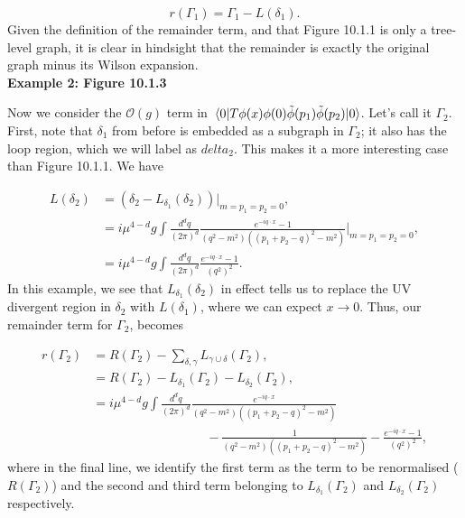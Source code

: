 \documentclass{article}
\begin{document}
\begin{equation}
    r(\Gamma_1) = \Gamma_1 - L(\delta_1).
\end{equation}
Given the definition of the remainder term, and that Figure 10.1.1 is only a tree-level graph, it is clear in hindsight that the remainder is exactly the original graph minus its Wilson expansion.\\

\noindent\textbf{Example 2: Figure 10.1.3}

Now we consider the $\mathcal{O}(g)$ term in $\mel{0}{T\phi(x)\phi(0)\Tilde{\phi}(p_1)\Tilde{\phi}(p_2)}{0}$. Let's call it $\Gamma_2$. First, note that $\delta_1$ from before is embedded as a subgraph in $\Gamma_2$; it also has the loop region, which we will label as $delta_2$. This makes it a more interesting case than Figure 10.1.1. We have

\begin{equation}
    \begin{split}
        L(\delta_2) &= (\delta_2 - L_{\delta_1}(\delta_2))\vert_{m=p_1=p_2=0},\\
        &=i\mu^{4-d}g \int \frac{d^dq}{(2\pi)^d} \frac{e^{-iq\cdot x}-1}{(q^2-m^2)((p_1+p_2-q)^2-m^2)}\bigg\vert_{m=p_1=p_2=0},\\
        &=i\mu^{4-d}g \int \frac{d^dq}{(2\pi)^d} \frac{e^{-iq\cdot x}-1}{(q^2)^2}.
    \end{split}
\end{equation}
In this example, we see that $L_{\delta_1}(\delta_2)$ in effect tells us to replace the UV divergent region in $\delta_2$ with $L(\delta_1)$, where we can expect $x\rightarrow 0$. Thus, our remainder term for $\Gamma_2$, becomes

\begin{equation}
    \begin{split}
        r(\Gamma_2) &= R(\Gamma_2) - \sum_{\delta,\gamma} L_{\gamma \cup \delta}(\Gamma_2),\\
        &= R(\Gamma_2) - L_{\delta_1}(\Gamma_2) - L_{\delta_2}(\Gamma_2),\\
        &=i\mu^{4-d}g \int \frac{d^dq}{(2\pi)^d} \frac{e^{-iq\cdot x}}{(q^2-m^2)((p_1+p_2-q)^2-m^2)} \\
        &\quad\quad\quad\quad\quad\quad\quad\quad\quad - \frac{1}{(q^2-m^2)((p_1+p_2-q)^2-m^2)} - \frac{e^{-iq\cdot x}-1}{(q^2)^2},
    \end{split}
\end{equation}
where in the final line, we identify the first term as the term to be renormalised ($R(\Gamma_2)$) and the second and  third term belonging to $L_{\delta_1}(\Gamma_2)$ and $L_{\delta_2}(\Gamma_2)$ respectively. 
\end{document}
